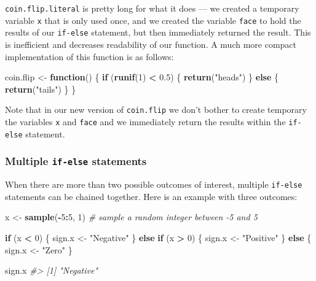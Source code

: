 \documentclass[]{book}
\newenvironment{Shaded}{\begin{snugshade}}{\end{snugshade}}
\newcommand{\CommentTok}[1]{\textcolor[rgb]{0.56,0.35,0.01}{\textit{#1}}}
\newcommand{\ControlFlowTok}[1]{\textcolor[rgb]{0.13,0.29,0.53}{\textbf{#1}}}
\newcommand{\DecValTok}[1]{\textcolor[rgb]{0.00,0.00,0.81}{#1}}
\newcommand{\FloatTok}[1]{\textcolor[rgb]{0.00,0.00,0.81}{#1}}
\newcommand{\KeywordTok}[1]{\textcolor[rgb]{0.13,0.29,0.53}{\textbf{#1}}}
\newcommand{\NormalTok}[1]{#1}
\newcommand{\OperatorTok}[1]{\textcolor[rgb]{0.81,0.36,0.00}{\textbf{#1}}}
\newcommand{\StringTok}[1]{\textcolor[rgb]{0.31,0.60,0.02}{#1}}
\theoremstyle{definition}
\theoremstyle{definition}
\theoremstyle{definition}
\theoremstyle{remark}
\begin{document}
\texttt{coin.flip.literal} is pretty long for what it does --- we
created a temporary variable \texttt{x} that is only used once, and we
created the variable \texttt{face} to hold the results of our
\texttt{if-else} statement, but then immediately returned the result.
This is inefficient and decreases readability of our function. A much
more compact implementation of this function is as follows:

\begin{Shaded}
\begin{Highlighting}[]
\NormalTok{coin.flip <-}\StringTok{ }\ControlFlowTok{function}\NormalTok{() \{}
  \ControlFlowTok{if}\NormalTok{ (}\KeywordTok{runif}\NormalTok{(}\DecValTok{1}\NormalTok{) }\OperatorTok{<}\StringTok{ }\FloatTok{0.5}\NormalTok{) \{}
    \KeywordTok{return}\NormalTok{(}\StringTok{"heads"}\NormalTok{)}
\NormalTok{  \} }\ControlFlowTok{else}\NormalTok{ \{}
    \KeywordTok{return}\NormalTok{(}\StringTok{"tails"}\NormalTok{)}
\NormalTok{  \}}
\NormalTok{\}}
\end{Highlighting}
\end{Shaded}

Note that in our new version of \texttt{coin.flip} we don't bother to
create temporary the variables \texttt{x} and \texttt{face} and we
immediately return the results within the \texttt{if-else} statement.

\hypertarget{multiple-if-else-statements}{%
\subsubsection{\texorpdfstring{Multiple \texttt{if-else}
statements}{Multiple if-else statements}}\label{multiple-if-else-statements}}

When there are more than two possible outcomes of interest, multiple
\texttt{if-else} statements can be chained together. Here is an example
with three outcomes:

\begin{Shaded}
\begin{Highlighting}[]
\NormalTok{x <-}\StringTok{ }\KeywordTok{sample}\NormalTok{(}\OperatorTok{-}\DecValTok{5}\OperatorTok{:}\DecValTok{5}\NormalTok{, }\DecValTok{1}\NormalTok{)  }\CommentTok{# sample a random integer between -5 and 5}

\ControlFlowTok{if}\NormalTok{ (x }\OperatorTok{<}\StringTok{ }\DecValTok{0}\NormalTok{) \{}
\NormalTok{  sign.x <-}\StringTok{ "Negative"}
\NormalTok{\} }\ControlFlowTok{else} \ControlFlowTok{if}\NormalTok{ (x }\OperatorTok{>}\StringTok{ }\DecValTok{0}\NormalTok{) \{}
\NormalTok{  sign.x <-}\StringTok{ "Positive"}
\NormalTok{\} }\ControlFlowTok{else}\NormalTok{ \{}
\NormalTok{  sign.x <-}\StringTok{ "Zero"}
\NormalTok{\}}

\NormalTok{sign.x}
\CommentTok{#> [1] "Negative"}
\end{Highlighting}
\end{Shaded}
\end{document}
